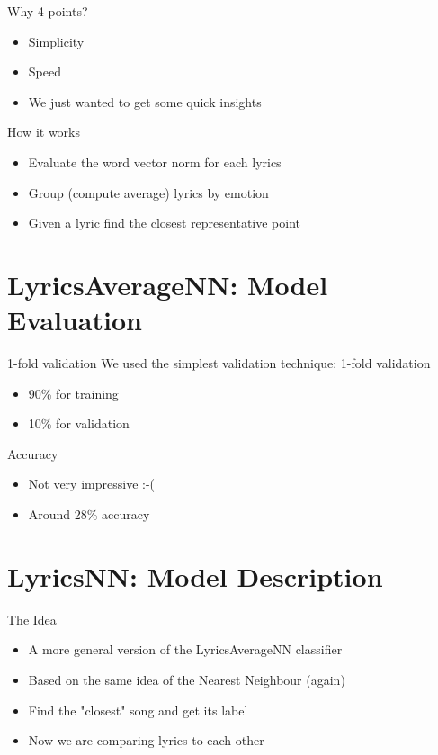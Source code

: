 \documentclass[xcolor=dvipsnames]{beamer}
\begin{document}
\begin{frame}{Why 4 points?}
\begin{itemize}
\item Simplicity
\item Speed
\item We just wanted to get some quick insights
\end{itemize}
\end{frame}

\begin{frame}{How it works}
\begin{itemize}
\item Evaluate the word vector norm for each lyrics
\item Group (compute average) lyrics by emotion
\item Given a lyric find the closest representative point
\end{itemize}
\end{frame}

\section{LyricsAverageNN: Model Evaluation}

\begin{frame}{1-fold validation}
We used the simplest validation technique: 1-fold validation
\begin{itemize}
\item 90\% for training
\item 10\% for validation
\end{itemize}
\end{frame}

\begin{frame}{Accuracy}
\begin{itemize}
\item Not very impressive :-(
\item Around 28\% accuracy
\end{itemize}
\end{frame}


\section{LyricsNN: Model Description}

\begin{frame}{The Idea}
\begin{itemize}
\item A more general version of the LyricsAverageNN classifier
\item Based on the same idea of the Nearest Neighbour (again)
\item Find the "closest" song and get its label
\item Now we are comparing lyrics to each other
\end{itemize}
\end{frame}
\end{document}

